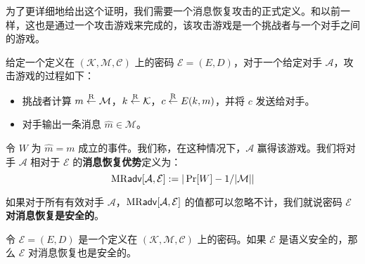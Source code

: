 为了更详细地给出这个证明，我们需要一个消息恢复攻击的正式定义。和以前一样，这也是通过一个攻击游戏来完成的，该攻击游戏是一个挑战者与一个对手之间的游戏。

\begin{game}[消息恢复]\label{game:2-2}
给定一个定义在 $(\mathcal{K},\mathcal{M},\mathcal{C})$ 上的密码 $\mathcal{E}=(E,D)$，对于一个给定对手 $\mathcal{A}$，攻击游戏的过程如下：
\begin{itemize}
	\item 挑战者计算 $m\overset{\rm R}\leftarrow\mathcal{M}$，$k\overset{\rm R}\leftarrow\mathcal{K}$，$c\overset{\rm R}\leftarrow E(k,m)$，并将 $c$ 发送给对手。
	\item 对手输出一条消息 $\hat m\in\mathcal{M}$。
\end{itemize}
令 $W$ 为 $\hat m=m$ 成立的事件。我们称，在这种情况下，$\mathcal{A}$ 赢得该游戏。我们将对手 $\mathcal{A}$ 相对于 $\mathcal{E}$ 的\textbf{消息恢复优势}定义为：
\[
{\rm MR\mathsf{adv}}[\mathcal{A},\mathcal{E}]:=|\Pr[W] -{1}/{|\mathcal{M}|}|
\]
\end{game}

\begin{definition}[针对消息恢复的安全性]
如果对于所有有效对手 $\mathcal{A}$，${\rm MR\mathsf{adv}}[\mathcal{A},\mathcal{E}]$ 的值都可以忽略不计，我们就说密码 $\mathcal{E}$ \textbf{对消息恢复是安全的}。
\end{definition}

\begin{theorem}\label{theo:2-7}
令 $\mathcal{E}=(E,D)$ 是一个定义在 $(\mathcal{K},\mathcal{M},\mathcal{C})$ 上的密码。如果 $\mathcal{E}$ 是语义安全的，那么 $\mathcal{E}$ 对消息恢复也是安全的。
\end{theorem}

